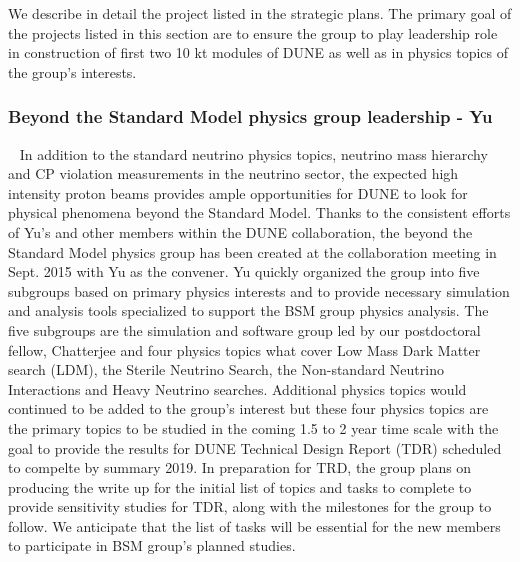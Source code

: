 \label{sec:IF_protoDUNE}
We describe in detail the project listed in the strategic plans.   The primary goal of the projects listed in this section are to ensure
the group to play leadership role in construction of first two 10 kt modules of DUNE as well as in physics topics of the group's 
interests.  
%
%
\subsubsection {Beyond the Standard Model physics group leadership - Yu}~\label{ss:dune-bsm}
In addition to the standard neutrino physics topics, neutrino mass hierarchy and CP violation measurements in the neutrino sector, the 
expected high intensity proton beams provides ample opportunities for DUNE to look for physical phenomena beyond the Standard Model.
Thanks to the consistent efforts of Yu's and other members within the DUNE collaboration, the beyond the Standard Model physics group 
has been created at the collaboration meeting in Sept. 2015 with Yu as the convener.
Yu quickly organized the group into five subgroups based on primary physics interests and to provide necessary
simulation and analysis tools specialized to support the BSM group physics analysis.
The five subgroups are the simulation and software group led by our postdoctoral fellow, Chatterjee and four physics topics what cover
Low Mass Dark Matter search (LDM), the Sterile Neutrino Search, the Non-standard Neutrino Interactions and Heavy Neutrino searches.
Additional physics topics would continued to be added to the group's interest but these four physics topics are the primary topics to be
studied in the coming 1.5 to 2 year time scale with the goal to provide the results for DUNE Technical Design Report (TDR) scheduled to compelte
by summary 2019.
In preparation for TRD, the group plans on producing the write up for the initial list of topics and tasks to complete to provide
sensitivity studies for TDR, along with the milestones for the group to follow.
We anticipate that the list of tasks will be essential for the new members to participate in BSM group's planned studies.
%
%
